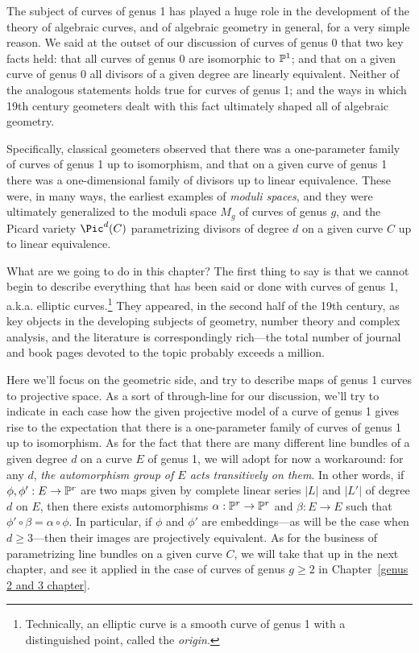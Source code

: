 The subject of curves of genus 1 has played a huge role in the development of the theory of algebraic curves, and of algebraic geometry in general, for a very simple reason. We said at the outset of our discussion of curves of genus 0 that two key facts held: that all curves of genus 0 are isomorphic to $\PP^1$; and that on a given curve of genus 0 all divisors of a given degree are linearly equivalent. Neither of the analogous statements holds true for curves of genus 1; and the ways in which 19th century geometers dealt with this fact ultimately shaped all of algebraic geometry.

Specifically, classical geometers observed that there was a one-parameter family of curves of genus 1 up to isomorphism, and that on a given curve of genus 1 there was a one-dimensional family of divisors up to linear equivalence. These were, in many ways, the earliest examples of \emph{moduli spaces}, and they were ultimately generalized to the moduli space $M_g$ of curves of genus $g$, and the Picard variety $\Pic^d(C)$ parametrizing divisors of degree $d$ on a given curve $C$ up to linear equivalence.

What are we going to do in this chapter? The first thing to say is that we cannot begin to describe everything that has been said or done with curves of genus 1,
 a.k.a. elliptic curves.\footnote{Technically, an elliptic curve is a smooth curve of genus 1 with a distinguished point, called the \emph{origin}.}  They appeared, in the second half of the 19th century, as key objects in the developing subjects of geometry, number theory and complex analysis, and the literature is correspondingly rich---the total number of journal and book pages devoted to the topic probably exceeds a million. 
 
 Here we'll focus on the geometric side, and try to describe maps of genus 1 curves to projective space. As a sort of through-line for our discussion, we'll try to indicate in each case how the given projective model of a curve of genus 1 gives rise to the expectation that there is a one-parameter family of curves of genus 1 up to isomorphism. As for the fact that there are many different line bundles of a given degree $d$ on a curve $E$ of genus 1, we will adopt for now a workaround: for any $d$, \emph{the automorphism group of $E$ acts transitively on them}. In other words, if $\phi, \phi' : E \to \PP^r$ are two maps given by complete linear series $|L|$ and $|L'|$ of degree $d$ on $E$, then there exists  automorphisms $\alpha : \PP^r \to \PP^r$ and $\beta : E \to E$ such that $\phi' \circ \beta= \alpha \circ \phi$. In particular, if $\phi$ and $\phi'$ are embeddings---as will be the case when $d \geq 3$---then their images are projectively equivalent. As for the business of parametrizing line bundles on a given curve $C$, we will take that up in the next chapter, and see it applied in the case of curves of genus $g \geq 2$ in Chapter~\ref{genus 2 and 3 chapter}.

